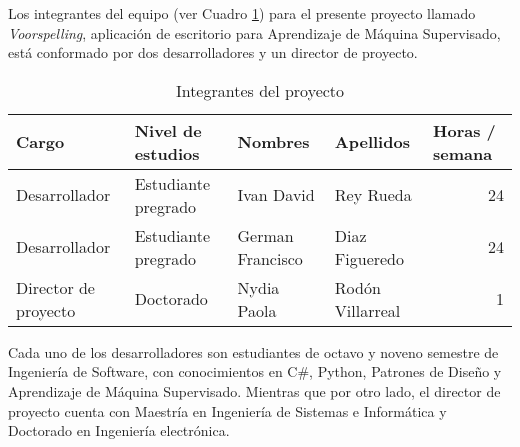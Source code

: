 Los integrantes del equipo (ver Cuadro \ref{tab:integrantes}) para el presente proyecto llamado \textit{Voorspelling}, aplicación de escritorio para Aprendizaje de Máquina Supervisado, está conformado por dos desarrolladores y un director de proyecto.

\begin{table}[H]
    \centering
    \caption{Integrantes del proyecto}
    \footnotesize
    \begin{tabular}{llllr}
        \hline
        Cargo & Nivel de estudios & Nombres & Apellidos & \multicolumn{1}{l}{Horas / semana} \bigstrut\\
        \hline
        Desarrollador & Estudiante pregrado & Ivan David & Rey Rueda & 24 \bigstrut[t]\\
        Desarrollador & Estudiante pregrado & German Francisco & Diaz Figueredo & 24 \\
        Director de proyecto & Doctorado & Nydia Paola & Rodón Villarreal & 1 \bigstrut[b]\\
        \hline
    \end{tabular}%
  \label{tab:integrantes}%
\end{table}%

Cada uno de los desarrolladores son estudiantes de octavo y noveno semestre de Ingeniería de Software, con conocimientos en C\#, Python, Patrones de Diseño y Aprendizaje de Máquina Supervisado. Mientras que por otro lado, el director de proyecto cuenta con Maestría en Ingeniería de Sistemas e Informática y Doctorado en Ingeniería electrónica.